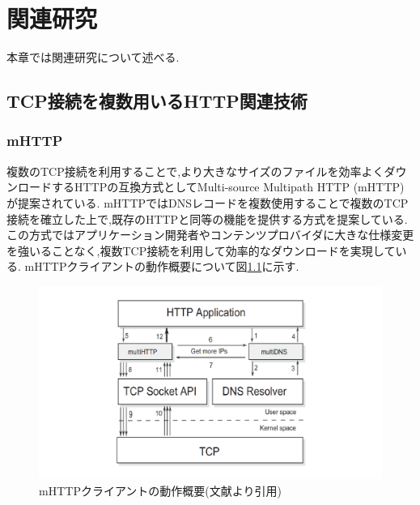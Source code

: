 \documentclass[a4j,12pt]{gradthesis_utf8}
\begin{document}
\chapter{関連研究}\label{sec:sec2}
本章では関連研究について述べる.

\section{TCP接続を複数用いるHTTP関連技術}
\subsection{mHTTP}
複数のTCP接続を利用することで,より大きなサイズのファイルを効率よくダウンロードするHTTP\cite{http}の互換方式としてMulti-source Multipath HTTP (mHTTP)\cite{mhttp}が提案されている.
mHTTPではDNSレコードを複数使用することで複数のTCP接続を確立した上で,既存のHTTPと同等の機能を提供する方式を提案している.この方式ではアプリケーション開発者やコンテンツプロバイダに大きな仕様変更を強いることなく,複数TCP接続を利用して効率的なダウンロードを実現している.
mHTTPクライアントの動作概要について図\ref{mhttp}に示す.

\begin{figure}[h]
	\centering
	\includegraphics[width=14cm]{figure/mhttp.pdf}
	\caption{mHTTPクライアントの動作概要(文献\cite{mhttp}より引用)}
	\label{mhttp}
\end{figure}

\newpage
\end{document}
